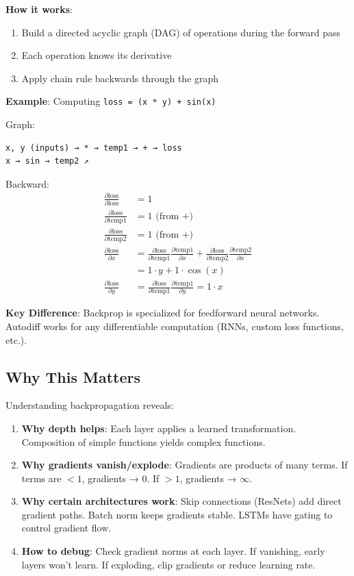 \documentclass[11pt,oneside]{book}
\begin{document}
\textbf{How it works}:
\begin{enumerate}
\item Build a directed acyclic graph (DAG) of operations during the forward pass
\item Each operation knows its derivative
\item Apply chain rule backwards through the graph
\end{enumerate}

\textbf{Example}: Computing \texttt{loss = (x * y) + sin(x)}

Graph:
\begin{verbatim}
x, y (inputs) → * → temp1 → + → loss
x → sin → temp2 ↗
\end{verbatim}

Backward:
\begin{align*}
\frac{\partial \text{loss}}{\partial \text{loss}} &= 1 \\
\frac{\partial \text{loss}}{\partial \text{temp1}} &= 1 \text{ (from +)} \\
\frac{\partial \text{loss}}{\partial \text{temp2}} &= 1 \text{ (from +)} \\
\frac{\partial \text{loss}}{\partial x} &= \frac{\partial \text{loss}}{\partial \text{temp1}} \frac{\partial \text{temp1}}{\partial x} + \frac{\partial \text{loss}}{\partial \text{temp2}} \frac{\partial \text{temp2}}{\partial x} \\
&= 1 \cdot y + 1 \cdot \cos(x) \\
\frac{\partial \text{loss}}{\partial y} &= \frac{\partial \text{loss}}{\partial \text{temp1}} \frac{\partial \text{temp1}}{\partial y} = 1 \cdot x
\end{align*}

\textbf{Key Difference}: Backprop is specialized for feedforward neural networks. Autodiff works for any differentiable computation (RNNs, custom loss functions, etc.).

\subsection{Why This Matters}

Understanding backpropagation reveals:

\begin{enumerate}
\item \textbf{Why depth helps}: Each layer applies a learned transformation. Composition of simple functions yields complex functions.

\item \textbf{Why gradients vanish/explode}: Gradients are products of many terms. If terms are $< 1$, gradients → 0. If $> 1$, gradients → $\infty$.

\item \textbf{Why certain architectures work}: Skip connections (ResNets) add direct gradient paths. Batch norm keeps gradients stable. LSTMs have gating to control gradient flow.

\item \textbf{How to debug}: Check gradient norms at each layer. If vanishing, early layers won't learn. If exploding, clip gradients or reduce learning rate.
\end{enumerate}
\end{document}
